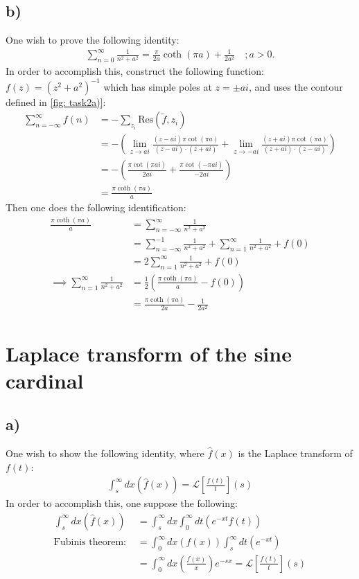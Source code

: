 \documentclass{article}
\newcommand{\res}[2]{\text{Res}(#1,#2)}
\begin{document}
\subsection*{b)}
One wish to prove the following identity:
\begin{align*}
    \sum_{n = 0}^\infty \frac{1}{n^2 + a^2} = \frac{\pi}{2a}\coth(\pi a) + \frac{1}{2a^2}\quad ; a > 0.
\end{align*}In order to accomplish this, construct the following function: $f(z) = (z^2 + a^2)^{-1}$ which has simple poles at $z = \pm ai$, and uses the contour defined in \ref{fig: task2a)}:
\begin{align*}
    \sum_{n = -\infty}^\infty f(n) &= - \sum_{z_i} \res{\tilde{f}}{z_i}\\
    &= -\left(\lim_{z\to ai}\frac{(z-ai)\pi\cot(\pi a)}{(z-ai)\cdot(z + ai)} + \lim_{z\to - ai}\frac{(z + ai)\pi\cot(\pi a)}{(z + ai)\cdot(z- ai)}\right)\\
    &= - \left(\frac{\pi\cot(\pi ai)}{2ai} + \frac{\pi\cot(-\pi ai)}{-2ai}\right)\\
    &= \frac{\pi\coth(\pi a)}{a}
\end{align*}
Then one does the following identification:
\begin{align*}
    \frac{\pi\coth(\pi a)}{a} &= \sum_{n = -\infty}^\infty\frac{1}{n^2 + a^2} \\
    &= \sum_{n = -\infty}^{-1}\frac{1}{n^2  + a^2} + \sum_{n = 1}^\infty\frac{1}{n^2 + a^2} + f(0)\\
    &= 2\sum_{n = 1}^\infty\frac{1}{n^2 + a^2} + f(0)\\
    \implies \sum_{n = 1}^\infty\frac{1}{n^2 + a^2} &= \frac{1}{2}\left(\frac{\pi\coth(\pi a)}{a} - f(0)\right)\\
    &= \frac{\pi\coth(\pi a)}{2a} - \frac{1}{2a^2}
\end{align*}

\section*{Laplace transform of the sine cardinal}
\subsection*{a)}
One wish to show the following identity, where $\hat{f}(x)$ is the Laplace transform of $f(t)$:
\begin{align*}
    \int_{s}^\infty dx \left(\hat{f}(x)\right) = \mathcal{L}\left[\frac{f(t)}{t}\right](s)
\end{align*}In order to accomplish this, one suppose the following:
\begin{align*}
    \int_{s}^\infty dx\left( \hat{f}(x)\right) &= \int_{s}^\infty dx\int_{0}^\infty dt\left(e^{-xt}f(t)\right)\\
    \text{Fubinis theorem: } &= \int_{0}^\infty dx \left(f(x)\right) \int_{s}^\infty dt\left(e^{-xt}\right)\\
    &= \int_{0}^\infty dx \left(\frac{f(x)}{x}\right) e^{-sx} = \mathcal{L}\left[\frac{f(t)}{t}\right](s)\\
\end{align*}
\end{document}

